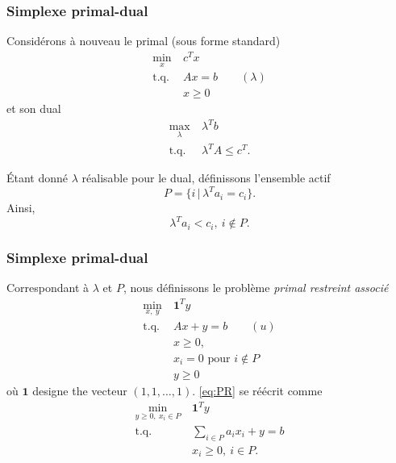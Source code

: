 \documentclass[t, aspectratio=169, usepdftitle=false]{beamer}
\def\bone{\boldsymbol{1}}
\begin{document}
\begin{frame}
\frametitle{Simplexe primal-dual}

Considérons à nouveau le primal (sous forme standard)
\begin{equation}
\tag{P}
\begin{aligned}
\min_x \ & c^Tx \\
\mbox{t.q. } & Ax = b \qquad (\lambda) \\
& x \geq 0
\end{aligned}
\label{eq:P}
\end{equation}
et son dual
\begin{equation}
\tag{D}
\begin{aligned}
\max_{\lambda} \ & \lambda^T b \\
\mbox{t.q. } & \lambda^T A \leq c^T.
\end{aligned}
\label{eq:D}
\end{equation}

\mbox{}

Étant donné $\lambda$ réalisable pour le dual, définissons l'ensemble actif
\[
P = \lbrace i \,|\, \lambda^T a_i = c_i \rbrace.
\]
Ainsi,
\[
\lambda^T a_i < c_i,\ i \notin P.
\]

\end{frame}

\begin{frame}
\frametitle{Simplexe primal-dual}

Correspondant à $\lambda$ et $P$, nous définissons le problème {\sl primal restreint associé}
\begin{equation}
\tag{PR}
\label{eq:PR}
\begin{aligned}
\min_{x,\ y} \ & \bone^Ty \\
\mbox{t.q. } & Ax + y = b  \qquad (u)\\
& x \geq 0,\\
& x_i = 0 \mbox{ pour } i \notin P\\
& y \geq 0
\end{aligned}
\end{equation}
où $\bone$ designe the vecteur $(1, 1, \ldots, 1)$.
\eqref{eq:PR} se réécrit comme
$$
\begin{aligned}
\min_{y \geq 0,\ x_i \in P} \ & \bone^Ty \\
\mbox{t.q. } & \sum_{i \in P} a_ix_i + y = b \\
& x_i \geq 0,\  i \in P.
\end{aligned}
$$

\end{frame}
\end{document}
